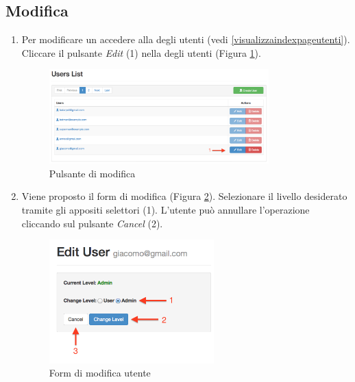 	\subsection{Modifica} %
	\label{utenti-modifica}
		\begin{enumerate}

				\item Per modificare un  accedere alla  degli utenti (vedi \ref{visualizzaindexpageutenti}). Cliccare il pulsante \emph{Edit} (1) nella  degli utenti (Figura \ref{fig:editUserButton}).
					\begin{figure}[H]
						\centering \includegraphics[width=0.8\textwidth]{img/editUserButton.png}
						\caption{ \label{fig:editUserButton} Pulsante di modifica }
					\end{figure}

				\item Viene proposto il form di modifica (Figura \ref{fig:editUserLevel}). Selezionare il livello  desiderato tramite gli appositi selettori (1). L'utente può annullare l'operazione cliccando sul pulsante \emph{Cancel} (2).

					\begin{figure}[H]
						\centering \includegraphics[width=0.6\textwidth]{img/editUserLevel.png}
						\caption{ \label{fig:editUserLevel} Form di modifica utente}
					\end{figure}


\end{enumerate}
